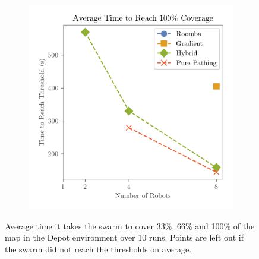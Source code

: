 \begin{figure}[H]
\begin{subfigure}[b]{\w}
    \end{subfigure}
    \begin{subfigure}[b]{\w}
        \centering
        \includegraphics[width=\textwidth]{figures/plots/benchmarks/big-coverage-1.0-depot.png}
    \end{subfigure}
    \caption{Average time it takes the swarm to cover 33\%, 66\% and 100\% of the map in the Depot environment over 10 runs. Points are left out if the swarm did not reach the thresholds on average.}
    \label{fig:depot-threshold}
\end{figure}

